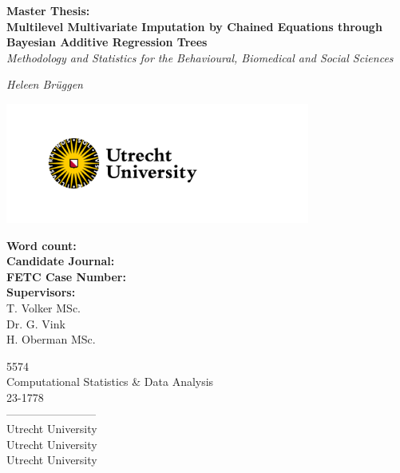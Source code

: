 \documentclass[10pt, a4paper, titlepage]{article}
\begin{document}
\begin{titlingpage}
\begin{center}
\Huge\textbf{Master Thesis:  \\ Multilevel Multivariate Imputation by Chained Equations through Bayesian Additive Regression Trees} \\
\Large\textit{Methodology and Statistics for the Behavioural, Biomedical and Social Sciences}

\vspace{.5cm}

\normalsize\textit{Heleen Brüggen}

\vspace{11.5cm}

\begin{minipage}{.5\textwidth}
\begin{center}
        \includegraphics[width=10cm]{graphs/UU_logo_2021_EN_RGB.png}
\end{center}
\end{minipage}%

\vspace{.25cm}

\begin{minipage}{0.5\textwidth}
\begin{flushleft}

\textbf{Word count:} \\
\textbf{Candidate Journal:} \\
\textbf{FETC Case Number:} \\
\textbf{Supervisors:} \\
T. Volker MSc. \\
Dr. G. Vink \\
H. Oberman MSc.
\end{flushleft}
\end{minipage}%
\begin{minipage}{0.5\textwidth}
\begin{flushright}

5574 \\ %
Computational Statistics \& Data Analysis \\
23-1778 \\
------------------------\\
Utrecht University \\
Utrecht University \\
Utrecht University
\end{flushright}
\end{minipage}

\end{center}
\end{titlingpage}
\end{document}
